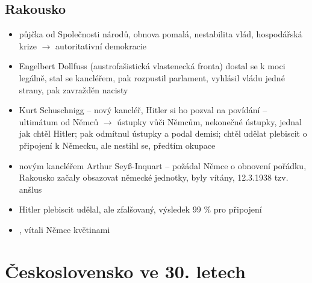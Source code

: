 \documentclass{article}
\begin{document}
\subsection*{Rakousko}
\begin{itemize}
    \item půjčka od Společnosti národů, obnova pomalá, nestabilita vlád, hospodářská krize $\rightarrow$ autoritativní demokracie
    \item Engelbert Dollfuss (austrofašistická vlastenecká fronta) dostal se k moci legálně, stal se kancléřem, pak rozpustil parlament, vyhlásil vládu jedné strany, pak zavražděn nacisty
    \item Kurt Schuschnigg -- nový kancléř, Hitler si ho pozval na povídání -- ultimátum od Němců $\rightarrow$ ústupky vůči Němcům, nekonečné ústupky, jednal jak chtěl Hitler; pak odmítnul ústupky a podal demisi; chtěl udělat plebiscit o připojení k Německu, ale nestihl se, předtím okupace
    \item novým kancléřem Arthur Seyß-Inquart -- požádal Němce o obnovení pořádku, Rakousko začaly obsazovat německé jednotky, byly vítány, 12.3.1938 tzv. anšlus
    \item Hitler plebiscit udělal, ale zfalšovaný, výsledek 99 \% pro připojení
    \item {}, vítali Němce květinami
\end{itemize}

\section*{Československo ve 30. letech}
\end{document}
